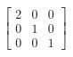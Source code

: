\documentclass[preview]{standalone}
\begin{document}
\begin{align*}
\begin{bmatrix} 2 & 0 & 0 \\ 0 & 1 & 0 \\ 0 & 0 & 1 \end{bmatrix}
\end{align*}
\end{document}
